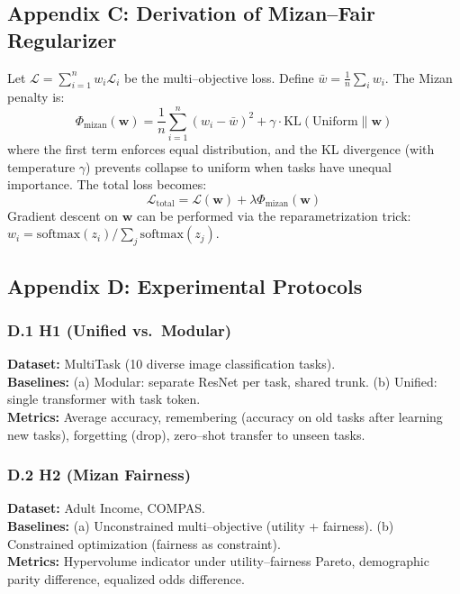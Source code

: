 \documentclass[12pt,twocolumn]{article}
\begin{document}
\subsection*{Appendix C: Derivation of Mizan--Fair Regularizer}
Let $\mathcal{L} = \sum_{i=1}^n w_i \mathcal{L}_i$ be the multi--objective loss. Define $\bar{w} = \frac{1}{n}\sum_i w_i$. The Mizan penalty is:
\begin{equation}
\Phi_{\text{mizan}}(\mathbf{w}) = \frac{1}{n}\sum_{i=1}^n (w_i - \bar{w})^2 + \gamma \cdot \text{KL}( \text{Uniform} \| \mathbf{w})
\end{equation}
where the first term enforces equal distribution, and the KL divergence (with temperature $\gamma$) prevents collapse to uniform when tasks have unequal importance. The total loss becomes:
\begin{equation}
\mathcal{L}_{\text{total}} = \mathcal{L}(\mathbf{w}) + \lambda \Phi_{\text{mizan}}(\mathbf{w})
\end{equation}
Gradient descent on $\mathbf{w}$ can be performed via the reparametrization trick: $w_i = \text{softmax}(z_i)/\sum_j \text{softmax}(z_j)$.

\subsection*{Appendix D: Experimental Protocols}
\subsubsection*{D.1 H1 (Unified vs.\ Modular)}
\textbf{Dataset:} MultiTask (10 diverse image classification tasks). \\
\textbf{Baselines:} (a) Modular: separate ResNet per task, shared trunk. (b) Unified: single transformer with task token. \\
\textbf{Metrics:} Average accuracy, remembering (accuracy on old tasks after learning new tasks), forgetting (drop), zero--shot transfer to unseen tasks.

\subsubsection*{D.2 H2 (Mizan Fairness)}
\textbf{Dataset:} Adult Income, COMPAS. \\
\textbf{Baselines:} (a) Unconstrained multi--objective (utility + fairness). (b) Constrained optimization (fairness as constraint). \\
\textbf{Metrics:} Hypervolume indicator under utility--fairness Pareto, demographic parity difference, equalized odds difference.
\end{document}

